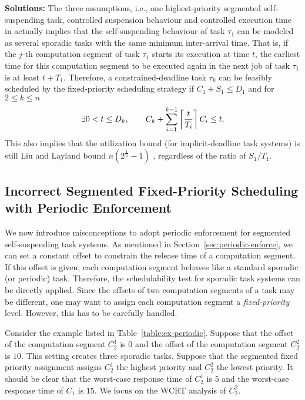 {\bf Solutions:} The three assumptions, i.e., one highest-priority segmented self-suspending task, controlled suspension behaviour and controlled execution time  in \cite{RTSS-KimANR13} actually implies that the self-suspending behaviour of task $\tau_1$ can be modeled as several sporadic tasks with the same minimum inter-arrival time. That is, if the $j$-th computation segment of task $\tau_1$ starts its execution at time $t$, the earliest time for this computation segment to be executed again in the next job of task $\tau_1$ is at least $t+T_1$. Therefore, a constrained-deadline task $\tau_k$ can be feasibly scheduled by the fixed-priority scheduling strategy if $C_1+S_1 \leq D_1$ and for $2 \leq k \leq n$
  \begin{equation}
    \label{eq:tda-fixed}
\exists 0 < t \leq D_k, \qquad C_k + \sum_{i=1}^{k-1}\left\lceil{\frac{t}{T_i}}\right\rceil C_i \leq t.    
  \end{equation}
This also implies that the utilization bound (for implicit-deadline task systems) is still Liu and Layland bound $n(2^{\frac{1}{n}}-1)$ \cite{Liu_1973}, regardless of the ratio of $S_1/T_1$. 

\subsection{Incorrect Segmented Fixed-Priority Scheduling with Periodic Enforcement}
\label{sec:wrong-periodic}

We now introduce misconceptions to adopt periodic enforcement for segmented self-suspending task systems. As mentioned in Section~\ref{sec:periodic-enforce}, we can set a constant offset to constrain the release time of a computation segment. If this offset is given, each computation segment behaves like a standard sporadic (or periodic) task. Therefore, the schedulability test for sporadic task systems can be directly applied. Since the offsets of two computation segments of a task may be different, one may want to assign each computation segment a \emph{fixed-priority} level.  However, this has to be carefully handled. 



Consider the example listed in Table~\ref{table:ex-periodic}. Suppose that the offset of the computation segment $C_2^1$ is $0$ and the offset of the computation segment $C_2^2$ is $10$. This setting creates three sporadic tasks.
Suppose that the segmented fixed priority assignment assigns $C_2^1$ the highest priority and $C_2^2$ the lowest priority. It should be clear that the worst-case response time of $C_2^1$ is $5$ and the worst-case response time of $C_1$ is $15$. We focus on the WCRT analysis of $C_2^2$.


